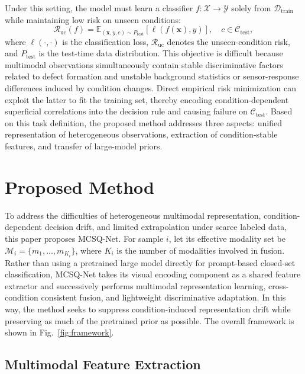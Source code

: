 \documentclass[journal]{IEEEtran}
\begin{document}
Under this setting, the model must learn a classifier $f:\mathcal{X}\rightarrow\mathcal{Y}$ solely from $\mathcal{D}_{\mathrm{train}}$ while maintaining low risk on unseen conditions:
\begin{equation}
\mathcal{R}_{\mathrm{uc}}(f)=\mathbb{E}_{(\mathbf{x},y,c)\sim P_{\mathrm{test}}}\left[\ell\!\left(f(\mathbf{x}),y\right)\right], \quad c\in\mathcal{C}_{\mathrm{test}},
\label{eq:uc_risk}
\end{equation}
where $\ell(\cdot,\cdot)$ is the classification loss, $\mathcal{R}_{\mathrm{uc}}$ denotes the unseen-condition risk, and $P_{\mathrm{test}}$ is the test-time data distribution. This objective is difficult because multimodal observations simultaneously contain stable discriminative factors related to defect formation and unstable background statistics or sensor-response differences induced by condition changes. Direct empirical risk minimization can exploit the latter to fit the training set, thereby encoding condition-dependent superficial correlations into the decision rule and causing failure on $\mathcal{C}_{\mathrm{test}}$. Based on this task definition, the proposed method addresses three aspects: unified representation of heterogeneous observations, extraction of condition-stable features, and transfer of large-model priors.

\section{Proposed Method}

To address the difficulties of heterogeneous multimodal representation, condition-dependent decision drift, and limited extrapolation under scarce labeled data, this paper proposes MCSQ-Net. For sample $i$, let its effective modality set be $\mathcal{M}_i=\{m_1,\dots,m_{K_i}\}$, where $K_i$ is the number of modalities involved in fusion. Rather than using a pretrained large model directly for prompt-based closed-set classification, MCSQ-Net takes its visual encoding component as a shared feature extractor and successively performs multimodal representation learning, cross-condition consistent fusion, and lightweight discriminative adaptation. In this way, the method seeks to suppress condition-induced representation drift while preserving as much of the pretrained prior as possible. The overall framework is shown in Fig.~\ref{fig:framework}.

\subsection{Multimodal Feature Extraction}
\end{document}
